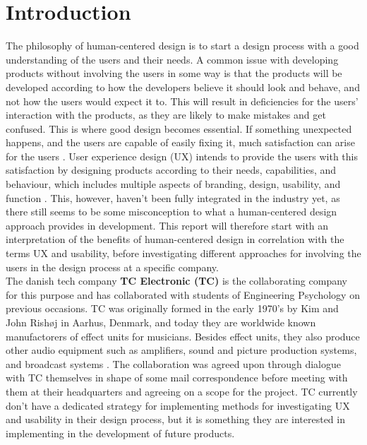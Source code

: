\chapter{Introduction}
\label{Introduction}
The philosophy of human-centered design is to start a design process with a good understanding of the users and their needs. A common issue with developing products without involving the users in some way is that the products will be developed according to how the developers believe it should look and behave, and not how the users would expect it to. This will result in deficiencies for the users' interaction with the products, as they are likely to make mistakes and get confused. This is where good design becomes essential. If something unexpected happens, and the users are capable of easily fixing it, much satisfaction can arise for the users \parencite[][6-9]{PDF:DonNorman}. User experience design (UX) intends to provide the users with this satisfaction by designing products according to their needs, capabilities, and behaviour, which includes multiple aspects of branding, design, usability, and function \parencite{WEB:UXDesign}. This, however, haven't been fully integrated in the industry yet, as there still seems to be some misconception to what a human-centered design approach provides in development. This report will therefore start with an interpretation of the benefits of human-centered design in correlation with the terms UX and usability, before investigating different approaches for involving the users in the design process at a specific company.\\

\noindent
The danish tech company \textbf{TC Electronic (TC)} is the collaborating company for this purpose and has collaborated with students of Engineering Psychology on previous occasions. TC was originally formed in the early 1970's by Kim and John Rishøj in Aarhus, Denmark, and today they are worldwide known manufactorers of effect units for musicians. Besides effect units, they also produce other audio equipment such as amplifiers, sound and picture production systems, and broadcast systems \parencite{WEB:TCElectronic}. The collaboration was agreed upon through dialogue with TC themselves in shape of some mail correspondence before meeting with them at their headquarters and agreeing on a scope for the project. TC currently don't have a dedicated strategy for implementing methods for investigating UX and usability in their design process, but it is something they are interested in implementing in the development of future products.

